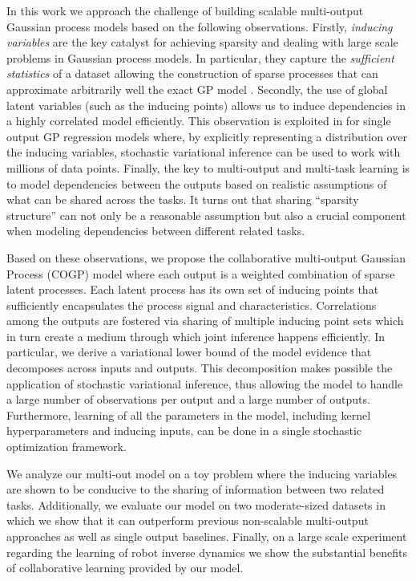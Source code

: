 In this work we approach the challenge of building scalable multi-output Gaussian process models  
based on the following observations.
Firstly, \emph{inducing variables} are the key catalyst
for achieving sparsity and dealing with large scale problems in Gaussian process models.
In particular, they capture the \emph{sufficient statistics} of a dataset allowing the construction of sparse 
processes that can approximate arbitrarily well the exact GP model \citep{titsias2009variational}.
Secondly, the use of global latent variables (such as the inducing points) allows us to 
induce dependencies in a highly correlated model efficiently. 
This observation is exploited in \cite{hensmangaussian} for single output GP regression models 
where, by explicitly representing a distribution over the inducing variables, stochastic variational inference 
can be used to work with millions of data points.
Finally, the key to multi-output and multi-task learning is to model dependencies between the outputs  
based on realistic assumptions of what can be shared across the tasks. It turns out that 
sharing  ``sparsity structure'' can not only be a reasonable assumption but also a crucial component
when modeling dependencies between different related tasks.


Based on these observations, we propose the collaborative multi-output Gaussian Process (COGP) model 
where each output is a weighted combination of sparse latent processes.
 Each latent process has its own set of inducing points that sufficiently encapsulates the process signal and characteristics.
Correlations among the outputs are fostered via sharing of multiple inducing point sets 
which in turn create a medium through which joint inference happens efficiently.
In particular, we derive a variational lower bound of the model evidence that decomposes across 
inputs and outputs. 
This decomposition makes possible the application of stochastic variational inference, 
thus allowing the model to handle a large number of observations per output and a large number of outputs.
Furthermore, learning of all  the  parameters in the model, including
kernel hyperparameters and inducing inputs, can be done in a single stochastic optimization framework.

We analyze our multi-out model on a toy problem  where the inducing variables are shown to be 
conducive to the sharing of information between two related tasks. 
Additionally, we  evaluate  our model on two moderate-sized datasets in which we show that it
can outperform previous non-scalable multi-output approaches as well as single output baselines.
Finally, on a  large scale experiment regarding the learning of robot inverse dynamics we show 
the substantial benefits of collaborative learning provided by our model.
  
